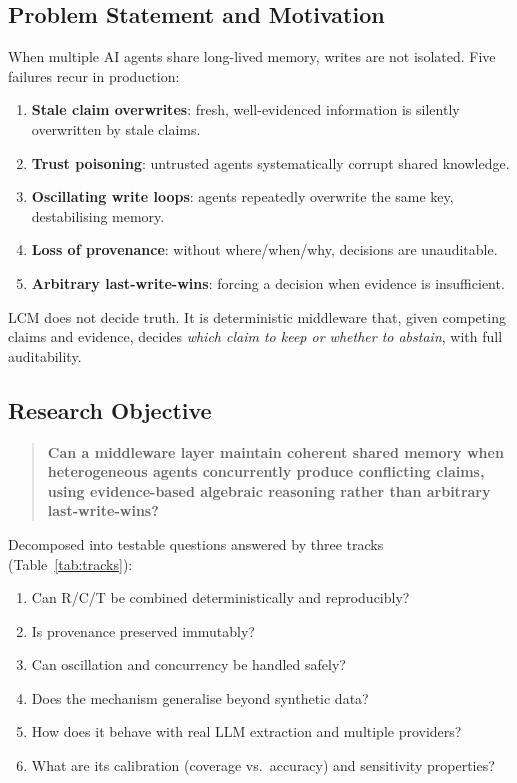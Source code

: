 \documentclass[12pt,a4paper]{article}
\begin{document}
\subsection{Problem Statement and Motivation}
When multiple AI agents share long-lived memory, writes are not isolated. Five failures recur in production:

\begin{enumerate}[leftmargin=*]
  \item \textbf{Stale claim overwrites}: fresh, well-evidenced information is silently overwritten by stale claims.
  \item \textbf{Trust poisoning}: untrusted agents systematically corrupt shared knowledge.
  \item \textbf{Oscillating write loops}: agents repeatedly overwrite the same key, destabilising memory.
  \item \textbf{Loss of provenance}: without where/when/why, decisions are unauditable.
  \item \textbf{Arbitrary last-write-wins}: forcing a decision when evidence is insufficient.
\end{enumerate}

LCM does not decide truth. It is deterministic middleware that, given competing claims and evidence, decides \emph{which claim to keep or whether to abstain}, with full auditability.

\subsection{Research Objective}
\begin{quote}
\textbf{Can a middleware layer maintain coherent shared memory when heterogeneous agents concurrently produce conflicting claims, using evidence-based algebraic reasoning rather than arbitrary last-write-wins?}
\end{quote}

Decomposed into testable questions answered by three tracks (Table~\ref{tab:tracks}):

\begin{enumerate}[leftmargin=*]
  \item Can R/C/T be combined deterministically and reproducibly?
  \item Is provenance preserved immutably?
  \item Can oscillation and concurrency be handled safely?
  \item Does the mechanism generalise beyond synthetic data?
  \item How does it behave with real LLM extraction and multiple providers?
  \item What are its calibration (coverage vs.\ accuracy) and sensitivity properties?
\end{enumerate}
\end{document}
